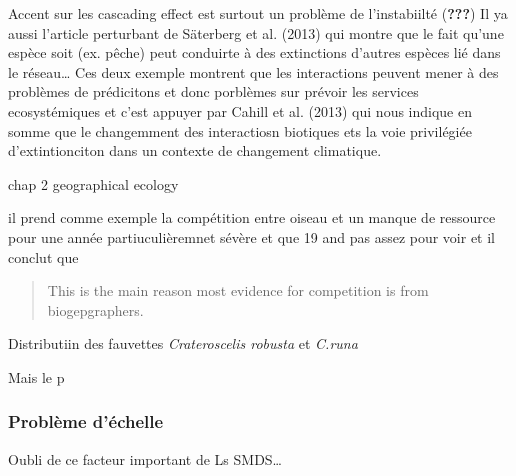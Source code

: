 Accent sur les cascading effect est surtout un problème de l'instabiilté
({\textbf{???}}) Il ya aussi l'article perturbant de Säterberg et al.
(2013) qui montre que le fait qu'une espèce soit (ex. pêche) peut
conduirte à des extinctions d'autres espèces lié dans le réseau\ldots{}
Ces deux exemple montrent que les interactions peuvent mener à des
problèmes de prédicitons et donc porblèmes sur prévoir les services
ecosystémiques et c'est appuyer par Cahill et al. (2013) qui nous
indique en somme que le changemment des interactiosn biotiques ets la
voie privilégiée d'extintionciton dans un contexte de changement
climatique.

chap 2 geographical ecology

il prend comme exemple la compétition entre oiseau et un manque de
ressource pour une année partiuculièremnet sévère et que 19 and pas
assez pour voir et il conclut que

\begin{quote}
This is the main reason most evidence for competition is from
biogepgraphers.
\end{quote}

Distributiin des fauvettes \emph{Crateroscelis robusta} et \emph{C.runa}

Mais le p

\subsubsection{Problème d'échelle}\label{probluxe8me-duxe9chelle}

Oubli de ce facteur important de Ls SMDS\ldots{}

